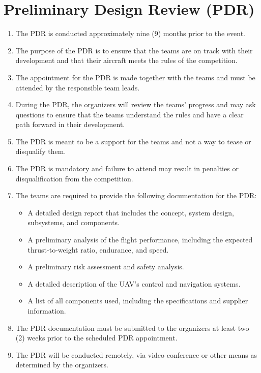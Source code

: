    \section{Preliminary Design Review (PDR)}
    \begin{enumerate}
    \item The PDR is conducted approximately nine (9) months prior to the event.
    \item The purpose of the PDR is to ensure that the teams are on track with their development and that their aircraft meets the rules of the competition.
    \item The appointment for the PDR is made together with the teams and must be attended by the responsible team leads.
    \item During the PDR, the organizers will review the teams' progress and may ask questions to ensure that the teams understand the rules and have a clear path forward in their development.
    \item The PDR is meant to be a support for the teams and not a way to tease or disqualify them.
    \item The PDR is mandatory and failure to attend may result in penalties or disqualification from the competition.
    \item The teams are required to provide the following documentation for the PDR:
    \begin{itemize}
    \item A detailed design report that includes the concept, system design, subsystems, and components.
    \item A preliminary analysis of the flight performance, including the expected thrust-to-weight ratio, endurance, and speed.
    \item A preliminary risk assessment and safety analysis.
    \item A detailed description of the UAV's control and navigation systems.
    \item A list of all components used, including the specifications and supplier information.
    \end{itemize}
    \item The PDR documentation must be submitted to the organizers at least two (2) weeks prior to the scheduled PDR appointment.
    \item The PDR will be conducted remotely, via video conference or other means as determined by the organizers.
    \end{enumerate}


